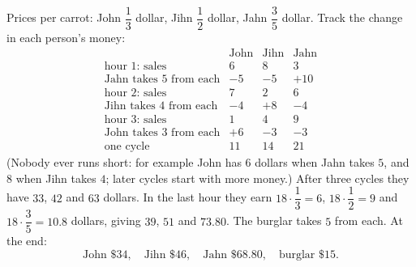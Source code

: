 Prices per carrot: John $\dfrac{1}{3}$ dollar, Jihn $\dfrac{1}{2}$ dollar, Jahn $\dfrac{3}{5}$ dollar. Track the change in each person's money:
\[
\begin{array}{l|c|c|c}
 & \text{John} & \text{Jihn} & \text{Jahn}\\ \hline
\text{hour 1: sales} & 6 & 8 & 3\\
\text{Jahn takes 5 from each} & -5 & -5 & +10\\
\text{hour 2: sales} & 7 & 2 & 6\\
\text{Jihn takes 4 from each} & -4 & +8 & -4\\
\text{hour 3: sales} & 1 & 4 & 9\\
\text{John takes 3 from each} & +6 & -3 & -3\\ \hline
\text{one cycle} & 11 & 14 & 21
\end{array}
\]
(Nobody ever runs short: for example John has $6$ dollars when Jahn takes $5$, and $8$ when Jihn takes $4$; later cycles start with more money.) After three cycles they have $33$, $42$ and $63$ dollars. In the last hour they earn $18\cdot\dfrac{1}{3}=6$, $18\cdot\dfrac{1}{2}=9$ and $18\cdot\dfrac{3}{5}=10.8$ dollars, giving $39$, $51$ and $73.80$. The burglar takes $5$ from each. At the end:
\[
\boxed{\text{John }\$34,\quad \text{Jihn }\$46,\quad \text{Jahn }\$68.80,\quad \text{burglar }\$15.}
\]
